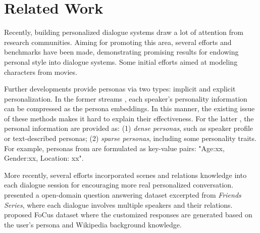 \documentclass[11pt]{article}
\begin{document}
\section{Related Work}
\label{related_work}
Recently, building personalized dialogue systems draw a lot of attention from research communities. Aiming for promoting this area, several efforts and benchmarks \cite{DBLP:conf/interspeech/ChenYZ21,DBLP:conf/acl-cmcl/Danescu-Niculescu-Mizil11,DBLP:journals/corr/abs-1901-09672,DBLP:conf/sigdial/YangC19,song2020profile,DBLP:conf/aaai/ZhengZHM20,DBLP:journals/corr/abs-2010-08923,chen2023orca,DBLP:conf/emnlp/YouCZ21}  have been made, demonstrating promising results for endowing personal style into dialogue systems. Some initial efforts \cite{DBLP:conf/acl-cmcl/Danescu-Niculescu-Mizil11} aimed at modeling characters from movies.

Further developments provide personas via two types: implicit and explicit personalization. In the former streams \cite{DBLP:conf/ijcai/KotturWC17,DBLP:conf/acl/LiGBSGD16,DBLP:journals/www/ZhangZWZL19}, each speaker's personality information can be compressed as the persona embeddings. In this manner, the existing issue of these methods makes it hard to explain their effectiveness. For the latter \cite{DBLP:journals/corr/abs-1901-08149, song2020profile}, the personal information are provided as: (1) \textit{dense personas}, such as speaker profile or text-described personas; (2) \textit{sparse personas}, including some personality traits. For example, personas from  \cite{DBLP:journals/corr/abs-1901-09672} are formulated as key-value pairs: "Age:xx, Gender:xx, Location: xx".




More recently, several efforts \cite{DBLP:conf/iclr/DinanRSFAW19,DBLP:conf/sigdial/YangC19,DBLP:journals/corr/abs-2112-08619,song2023improving} incorporated scenes and relations knowledge into each dialogue session for encouraging more real personalized conversation. \citet{DBLP:conf/sigdial/YangC19} presented a open-domain question answering dataset excerpted from \textit{Friends Series}, where each dialogue involves multiple speakers and their relations.
\citet{DBLP:journals/corr/abs-2112-08619} proposed FoCus dataset where the customized responses are generated based on the user's persona and Wikipedia background knowledge.
\end{document}
